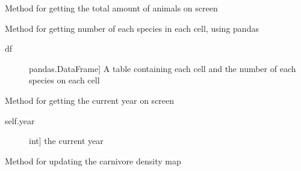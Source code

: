 \documentclass[a4paper,10pt,english]{sphinxmanual}
\begin{document}
\begin{fulllineitems}
\begin{fulllineitems}
\begin{description}
\end{description}

\end{fulllineitems}


\begin{fulllineitems}
\label{\detokenize{simulation:biosim.simulation.BioSim.status_number_of_animals_total}}
Method for getting the total amount of animals on screen

\end{fulllineitems}


\begin{fulllineitems}
\label{\detokenize{simulation:biosim.simulation.BioSim.status_per_cell_animal_count}}
Method for getting number of each species in each cell, using pandas
\begin{description}
\item[{df}] \leavevmode{[}pandas.DataFrame{]}
A table containing each cell and the number of each species on
each cell

\end{description}

\end{fulllineitems}


\begin{fulllineitems}
\label{\detokenize{simulation:biosim.simulation.BioSim.status_year}}
Method for getting the current year on screen
\begin{description}
\item[{self.year}] \leavevmode{[}int{]}
the current year

\end{description}

\end{fulllineitems}


\begin{fulllineitems}
\label{\detokenize{simulation:biosim.simulation.BioSim.update_carnivore_density_map}}
Method for updating the carnivore density map


\end{fulllineitems}
\end{fulllineitems}
\end{document}
